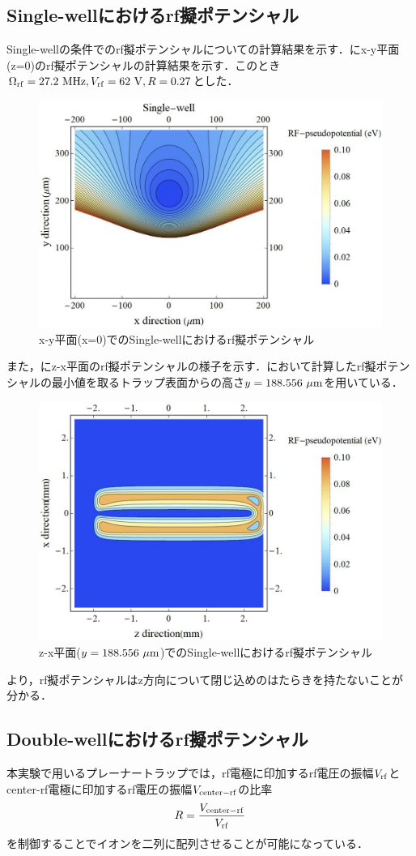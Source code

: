 \subsection{Single-wellにおけるrf擬ポテンシャル}
Single-wellの条件でのrf擬ポテンシャルについての計算結果を示す．にx-y平面(z=0)のrf擬ポテンシャルの計算結果を示す．このとき$\Omega_{\rm rf} = 27.2 \ {\rm MHz}, V_{\rm rf} = 62 \ {\rm V},R = 0.27$とした．
\begin{figure}[h]
	\begin{center}
	\includegraphics[width = 0.5\linewidth]{./simulation/figure/Single-well_Contour_xy@z=0.jpg}
	\caption{x-y平面(x=0)でのSingle-wellにおけるrf擬ポテンシャル}
	\label{fig:single-well_example_xy}
	\end{center}
\end{figure}
また，にz-x平面のrf擬ポテンシャルの様子を示す．において計算したrf擬ポテンシャルの最小値を取るトラップ表面からの高さ$y = 188.556 \ {\rm \mu m}$を用いている．
\begin{figure}[h]
	\begin{center}
	\includegraphics[width = 0.5\linewidth]{./simulation/figure/single-well_zx.jpg}
	\caption{z-x平面($y = 188.556 \ {\rm \mu m}$)でのSingle-wellにおけるrf擬ポテンシャル}
	\label{fig:single-well_example_zx}
	\end{center}
\end{figure}
より，rf擬ポテンシャルはz方向について閉じ込めのはたらきを持たないことが分かる．
\clearpage

\subsection{Double-wellにおけるrf擬ポテンシャル}
本実験で用いるプレーナートラップでは，rf電極に印加するrf電圧の振幅$V_{\rm rf}$とcenter-rf電極に印加するrf電圧の振幅$V_{\rm center-rf}$の比率
\large
\begin{align}
R = \frac{V_{\rm center-rf}}{V_{\rm rf}}
\end{align}
\normalsize
を制御することでイオンを二列に配列させることが可能になっている．

